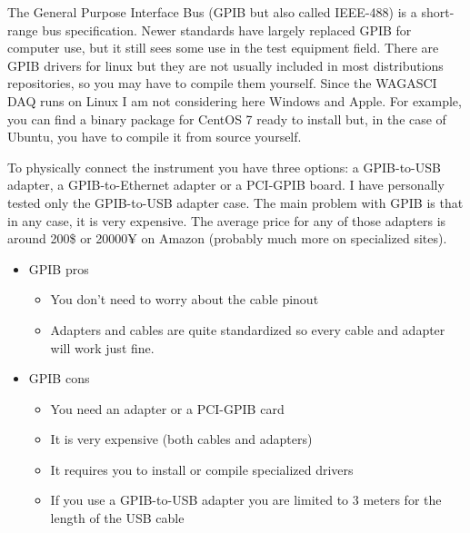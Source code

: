 The General Purpose Interface Bus (GPIB but also called IEEE-488) is a
short-range bus specification. Newer standards have largely replaced GPIB for
computer use, but it still sees some use in the test equipment field. There are
GPIB drivers for linux but they are not usually included in most distributions
repositories, so you may have to compile them yourself. Since the WAGASCI DAQ
runs on Linux I am not considering here Windows and Apple. For example, you can
find a binary package for CentOS 7 ready to install but, in the case of Ubuntu,
you have to compile it from source yourself.

To physically connect the instrument you have three options: a GPIB-to-USB
adapter, a GPIB-to-Ethernet adapter or a PCI-GPIB board. I have personally
tested only the GPIB-to-USB adapter case. The main problem with GPIB is that in
any case, it is very expensive. The average price for any of those adapters is
around 200\$ or 20000¥ on Amazon (probably much more on specialized sites).
\begin{itemize}
\item GPIB pros
  \begin{itemize}
  \item You don't need to worry about the cable pinout
  \item Adapters and cables are quite standardized so every cable and adapter
    will work just fine.
  \end{itemize}
\item GPIB cons
  \begin{itemize}
  \item You need an adapter or a PCI-GPIB card
  \item It is very expensive (both cables and adapters)
  \item It requires you to install or compile specialized drivers
  \item If you use a GPIB-to-USB adapter you are limited to 3 meters for the
    length of the USB cable
  \end{itemize}
\end{itemize}

